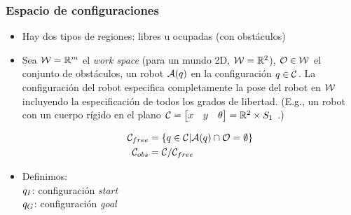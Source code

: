 \begin{frame}
    \frametitle{Espacio de configuraciones}
    \begin{itemize}
        \item Hay dos tipos de regiones: libres u ocupadas (con obstáculos)
        \item Sea $\mathcal{W} = \mathbb{R}^{m}$ el \emph{work space} (para un mundo 2D, $\mathcal{W} = \mathbb{R}^{2}$), $\mathcal{O} \in \mathcal{W}$ el conjunto de obstáculos, un robot $\mathcal{A}(q)$ en la configuración $q \in \mathcal{C}$.
        La configuración del robot especifica completamente la pose del robot en $\mathcal{W}$ incluyendo la especificación de todos los grados de libertad. (E.g., un robot con un cuerpo rígido en el plano $\mathcal{C} = \begin{bmatrix}
            x & y & \theta
        \end{bmatrix} = \mathbb{R}^{2} \times S_{1}$ .)
        
        \begin{align*}
            \mathcal{C}_{free} &= \left\lbrace q \in \mathcal{C} | \mathcal{A}(q) \cap \mathcal{O} =  \emptyset \right\rbrace\\
            \mathcal{C}_{obs} &= \mathcal{C} / \mathcal{C}_{free}
        \end{align*}
        
        \item Definimos:\\
        $q_{I}$: configuración \emph{start}\\
        $q_{G}$: configuración \emph{goal}
        
        
       
    \end{itemize}
    
\end{frame}

